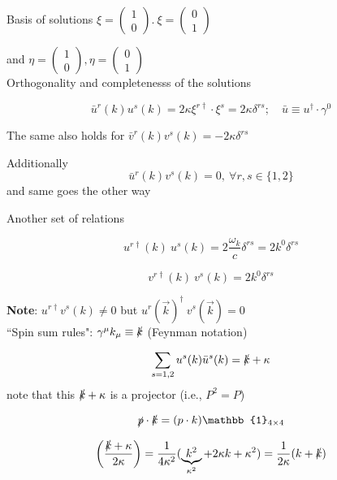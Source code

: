 \documentclass[11pt]{article}
\begin{document}
		
		Basis of solutions  $\xi = \begin{pmatrix}
			1 \\ 0 
		\end{pmatrix}.\ \xi = \begin{pmatrix}
		0 \\ 1
	\end{pmatrix}$

and $ \eta = \begin{pmatrix}
	1 \\ 0
\end{pmatrix}, \eta = \begin{pmatrix}
0 \\ 1
\end{pmatrix}$
	\\

	
	
	Orthogonality and completenesss of the solutions 
	
	\[ \bar{u}^r (k) u^s (k) = 2\kappa \xi^{r\dagger} \cdot \xi^s = 2\kappa \delta^{rs} ; \quad \bar{u} \equiv u^\dagger\cdot \gamma^0 \]	
	

			The same also holds for $\bar{v}^r(k) v^s(k) = -2\kappa \delta^{rs}	$
		
		Additionally \[ \bar{u}^r (k) v^s(k) = 0,\ \forall r,s \in \{1, 2\} \]
		and same goes the other way
		
		
		
			Another set of relations
			
			\[ u^{r\dagger} (k)\ u^s (k) = 2\frac{\omega_k}{c} \delta^{rs} = 2k^0 \delta^{rs}\]
			 
			 
			 \[ v^{r\dagger}(k)\ v^s(k) = 2k^0 \delta^{rs} \]
			 
			 
			 \textbf{Note}: $u^{r\dagger} v^s(k) \neq 0$ 
			 but $u^r(\vec{k})^\dagger\ v^s(\vec{k}) = 0$\\
			 
		
			``Spin sum rules": $\gamma^\mu k_\mu \equiv \slashed{k}$ (Feynman notation)	
			
			\[ \sum_{s=1,2} u^s(k) \bar{u}^s (k)  = \slashed{k} + \kappa \]
			 note that this $\slashed{k} + \kappa$ is a projector (i.e., $P^2 = P$)
			 
			 \[ \slashed{p} \cdot \slashed{k} = (p\cdot k) \mathbb{1}_{4\times 4}\]
			 
			 \[ \left( \frac{\slashed{k} + \kappa}{2\kappa} \right) = \frac{1}{4\kappa^2} (\underbrace{k^2}_{\kappa^2} + 2\kappa k + \kappa^2)  = \frac{1}{2\kappa} (k + \slashed{k})\]
			   
\end{document}
